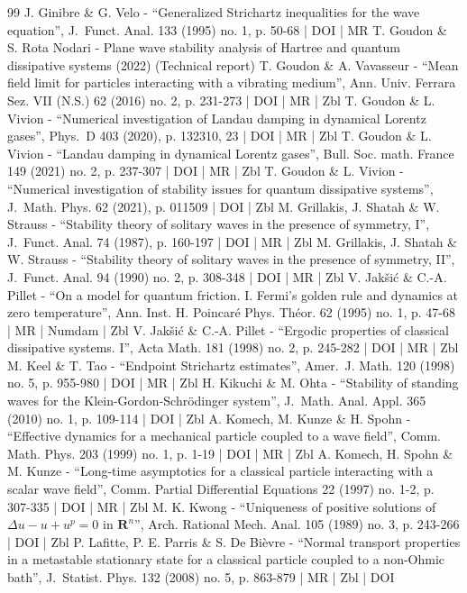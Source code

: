 \begin{thebibliography}{99}
J. Ginibre \& G. Velo - “Generalized Strichartz inequalities for the wave equation”, J. Funct. Anal. 133 (1995) no. 1, p. 50-68 | DOI | MR
T. Goudon \& S. Rota Nodari - Plane wave stability analysis of Hartree and quantum dissipative systems (2022) (Technical report)
T. Goudon \& A. Vavasseur - “Mean field limit for particles interacting with a vibrating medium”, Ann. Univ. Ferrara Sez. VII (N.S.) 62 (2016) no. 2, p. 231-273 | DOI | MR | Zbl
T. Goudon \& L. Vivion - “Numerical investigation of Landau damping in dynamical Lorentz gases”, Phys. D 403 (2020), p. 132310, 23 | DOI | MR | Zbl
T. Goudon \& L. Vivion - “Landau damping in dynamical Lorentz gases”, Bull. Soc. math. France 149 (2021) no. 2, p. 237-307 | DOI | MR | Zbl
T. Goudon \& L. Vivion - “Numerical investigation of stability issues for quantum dissipative systems”, J. Math. Phys. 62 (2021), p. 011509 | DOI | Zbl
M. Grillakis, J. Shatah \& W. Strauss - “Stability theory of solitary waves in the presence of symmetry, I”, J. Funct. Anal. 74 (1987), p. 160-197 | DOI | MR | Zbl
M. Grillakis, J. Shatah \& W. Strauss - “Stability theory of solitary waves in the presence of symmetry, II”, J. Funct. Anal. 94 (1990) no. 2, p. 308-348 | DOI | MR | Zbl
V. Jakšić \& C.-A. Pillet - “On a model for quantum friction. I. Fermi’s golden rule and dynamics at zero temperature”, Ann. Inst. H. Poincaré Phys. Théor. 62 (1995) no. 1, p. 47-68 | MR | Numdam | Zbl
V. Jakšić \& C.-A. Pillet - “Ergodic properties of classical dissipative systems. I”, Acta Math. 181 (1998) no. 2, p. 245-282 | DOI | MR | Zbl
M. Keel \& T. Tao - “Endpoint Strichartz estimates”, Amer. J. Math. 120 (1998) no. 5, p. 955-980 | DOI | MR | Zbl
H. Kikuchi \& M. Ohta - “Stability of standing waves for the Klein-Gordon-Schrödinger system”, J. Math. Anal. Appl. 365 (2010) no. 1, p. 109-114 | DOI | Zbl
A. Komech, M. Kunze \& H. Spohn - “Effective dynamics for a mechanical particle coupled to a wave field”, Comm. Math. Phys. 203 (1999) no. 1, p. 1-19 | DOI | MR | Zbl
A. Komech, H. Spohn \& M. Kunze - “Long-time asymptotics for a classical particle interacting with a scalar wave field”, Comm. Partial Differential Equations 22 (1997) no. 1-2, p. 307-335 | DOI | MR | Zbl
M. K. Kwong - “Uniqueness of positive solutions of $\Delta u-u+u^p=0$ in ${\mathbf{R}}^n$”, Arch. Rational Mech. Anal. 105 (1989) no. 3, p. 243-266 | DOI | Zbl
P. Lafitte, P. E. Parris \& S. De Bièvre - “Normal transport properties in a metastable stationary state for a classical particle coupled to a non-Ohmic bath”, J. Statist. Phys. 132 (2008) no. 5, p. 863-879 | MR | Zbl | DOI

\end{thebibliography}
